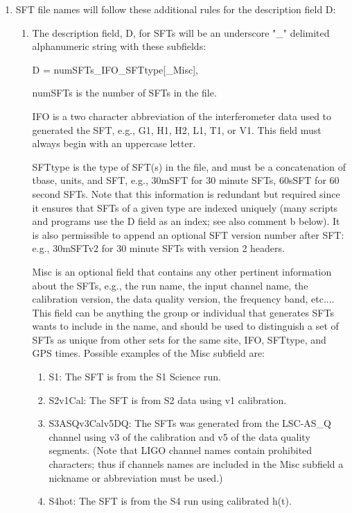 \documentclass{ligodcc}
\begin{document}
\begin{enumerate}
\item SFT file names will follow these additional rules for the description
field D:

\begin{enumerate}
\item The description field, D, for SFTs will be an underscore "\_"
delimited alphanumeric string with these subfields:

D = numSFTs\_IFO\_SFTtype[\_Misc],

numSFTs is the number of SFTs in the file.

IFO is a two character abbreviation of the interferometer data used to
generated the SFT, e.g., G1, H1, H2, L1, T1, or V1.  This field must
always begin with an uppercase letter.

SFTtype is the type of SFT(s) in the file, and must be a concatenation
of tbase, units, and SFT, e.g., 30mSFT for 30 minute SFTs, 60sSFT for 60
second SFTs.  Note that this information is redundant but required since
it ensures that SFTs of a given type are indexed uniquely (many scripts
and programs use the D field as an index; see also comment b below). It
is also permissible to append an optional SFT version number after SFT:
e.g., 30mSFTv2 for 30 minute SFTs with version 2 headers.

Misc is an optional field that contains any other pertinent information
about the SFTs, e.g., the run name, the input channel name, the
calibration version, the data quality version, the frequency band,
etc.... This field can be anything the group or individual that
generates SFTs wants to include in the name, and should be used to
distinguish a set of SFTs as unique from other sets for the same site,
IFO, SFTtype, and GPS times. Possible examples of the Misc subfield are:
\begin{enumerate}
\item S1: The SFT is from the S1 Science run.
\item S2v1Cal: The SFT is from S2 data using v1 calibration.
\item  S3ASQv3Calv5DQ: The SFTs was generated from the LSC-AS\_Q channel
  using v3 of the calibration and v5 of the data quality segments.  (Note
  that LIGO channel names contain prohibited characters; thus if channels
  names are included in the Misc subfield a nickname or abbreviation must
  be used.)
\item S4hot: The SFT is from the S4 run using calibrated h(t).
\end{enumerate}


\end{enumerate}
\end{enumerate}
\end{document}
